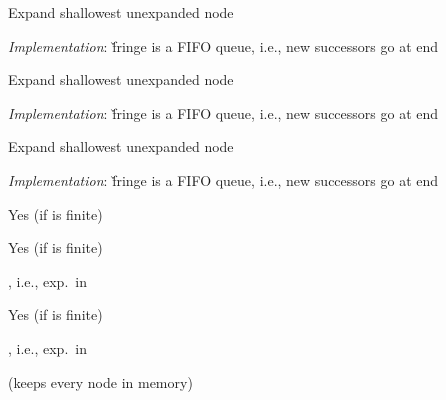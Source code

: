 \documentclass{article}
\begin{document}
\begin{huge}
Expand shallowest unexpanded node

\emph{Implementation}:\nl
\v{fringe} is a FIFO queue, i.e., new successors go at end

\textwidth
{}


Expand shallowest unexpanded node

\emph{Implementation}:\nl
\v{fringe} is a FIFO queue, i.e., new successors go at end

\textwidth
{}


Expand shallowest unexpanded node

\emph{Implementation}:\nl
\v{fringe} is a FIFO queue, i.e., new successors go at end

\textwidth
{}





 Yes (if  is finite)



 Yes (if  is finite)

 , i.e., exp.~in 



 Yes (if  is finite)

 , i.e., exp.~in 

  (keeps every node in memory)


\end{huge}
\end{document}
